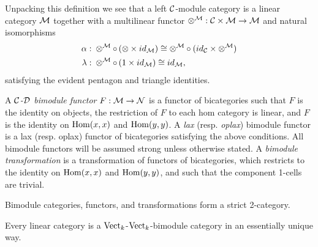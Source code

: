 \documentclass{amsart}
\begin{document}
Unpacking this definition we see that a left $\mathcal C$-module category is a linear category $\mathcal M$ together with a multilinear functor $\otimes^{\mathcal M}: \mathcal C \times \mathcal M \to \mathcal M$ and natural isomorphisms
	\begin{align*}
		\alpha: & \;    \otimes^{\mathcal M} \circ \, (\otimes \times id_{\mathcal M}) \cong  \otimes^{\mathcal M} \circ (id_{\mathcal C} \times \otimes^{\mathcal M}) \\
		\lambda: & \; \otimes^{\mathcal M} \circ \, (1 \times id_{\mathcal M}) \cong id_{\mathcal M},
	\end{align*}
	satisfying the evident pentagon and triangle identities. 

\begin{definition}		
A {\em $\mathcal C$-$\mathcal D$ bimodule functor} $F:\mathcal M \to \mathcal N$ is a functor of bicategories such that %
		 $F$ is the identity on objects,
		  the restriction of $F$ to each hom category is linear,
		 and $F$ is the identity on $\operatorname{Hom}(x,x)$ and $\operatorname{Hom}(y,y)$.
A {\em lax} (resp. {\em oplax}) bimodule functor is a lax (resp. oplax) functor of bicategories satisfying the above conditions. All bimodule functors will be assumed strong unless otherwise stated. 
	A {\em bimodule transformation} is a transformation of functors of bicategories, which restricts to the identity on $\operatorname{Hom}(x,x)$ and $\operatorname{Hom}(y,y)$, and such that the component 1-cells are trivial.  
\end{definition}
	
%
Bimodule categories, functors, and transformations form a strict 2-category.

\begin{example}
	Every linear category is a $\mathrm{Vect}_k$-$\mathrm{Vect}_k$-bimodule category in an essentially unique way. 
\end{example}
\end{document}
